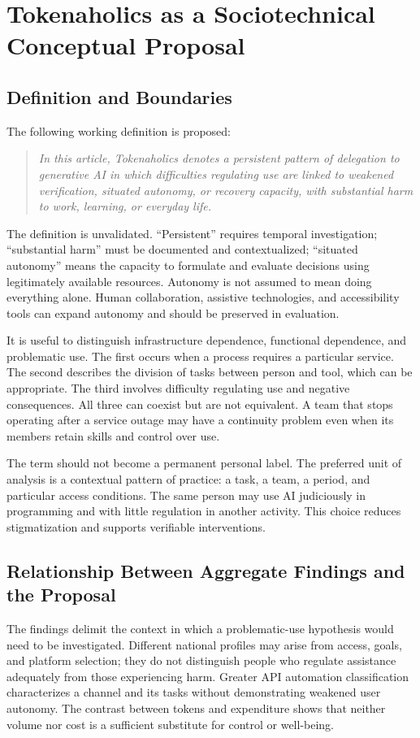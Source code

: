 \documentclass[11pt,a4paper]{article}
\begin{document}
\section{Tokenaholics as a Sociotechnical Conceptual Proposal}
\subsection{Definition and Boundaries}
The following working definition is proposed:
\begin{quote}
\textit{In this article, Tokenaholics denotes a persistent pattern of delegation to generative AI in which difficulties regulating use are linked to weakened verification, situated autonomy, or recovery capacity, with substantial harm to work, learning, or everyday life.}
\end{quote}
The definition is unvalidated. ``Persistent'' requires temporal investigation; ``substantial harm'' must be documented and contextualized; ``situated autonomy'' means the capacity to formulate and evaluate decisions using legitimately available resources. Autonomy is not assumed to mean doing everything alone. Human collaboration, assistive technologies, and accessibility tools can expand autonomy and should be preserved in evaluation.

It is useful to distinguish infrastructure dependence, functional dependence, and problematic use. The first occurs when a process requires a particular service. The second describes the division of tasks between person and tool, which can be appropriate. The third involves difficulty regulating use and negative consequences. All three can coexist but are not equivalent. A team that stops operating after a service outage may have a continuity problem even when its members retain skills and control over use.

The term should not become a permanent personal label. The preferred unit of analysis is a contextual pattern of practice: a task, a team, a period, and particular access conditions. The same person may use AI judiciously in programming and with little regulation in another activity. This choice reduces stigmatization and supports verifiable interventions.

\subsection{Relationship Between Aggregate Findings and the Proposal}
The findings delimit the context in which a problematic-use hypothesis would need to be investigated. Different national profiles may arise from access, goals, and platform selection; they do not distinguish people who regulate assistance adequately from those experiencing harm. Greater API automation classification characterizes a channel and its tasks without demonstrating weakened user autonomy. The contrast between tokens and expenditure shows that neither volume nor cost is a sufficient substitute for control or well-being.
\end{document}
